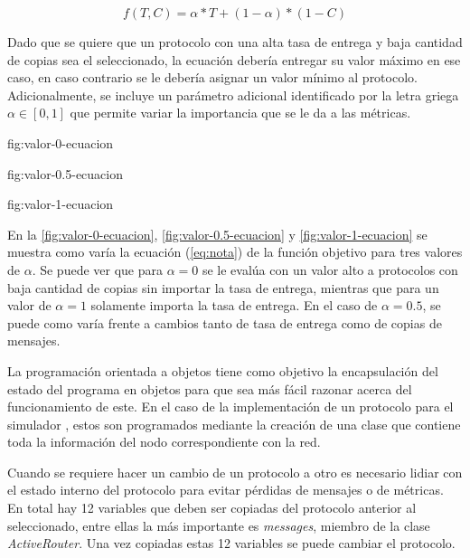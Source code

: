 


\begin{equation}
  f(T, C) = \alpha*T + (1 - \alpha)*(1 - C)
  \label{eq:nota}
\end{equation}

Dado que se quiere que un protocolo con una alta tasa de entrega y baja cantidad
de copias sea el seleccionado, la ecuación debería entregar su valor máximo en
ese caso, en caso contrario se le debería asignar un valor mínimo al protocolo.
Adicionalmente, se incluye un parámetro adicional identificado por la letra
griega $\alpha \in [0, 1]$ que permite variar la importancia que se le da a las
métricas. 



{}{fig:valor-0-ecuacion}

{}{fig:valor-0.5-ecuacion}

{}{fig:valor-1-ecuacion}

En la \ref{fig:valor-0-ecuacion}, \ref{fig:valor-0.5-ecuacion} y
\ref{fig:valor-1-ecuacion} se muestra como varía la ecuación (\ref{eq:nota}) de
la función objetivo para tres valores de $\alpha$. Se puede ver que para $\alpha
= 0$ se le evalúa con un valor alto a protocolos con baja cantidad de copias sin
importar la tasa de entrega, mientras que para un valor de $\alpha = 1$
solamente importa la tasa de entrega. En el caso de $\alpha = 0.5$, se puede
como varía frente a cambios tanto de tasa de entrega como de copias de mensajes.






La programación orientada a objetos tiene como objetivo la encapsulación del
estado del programa en objetos para que sea más fácil razonar acerca del
funcionamiento de este. En el caso de la implementación de un protocolo para el
simulador \theone, estos son programados mediante la creación de una clase que
contiene toda la información del nodo correspondiente con la red.


Cuando se requiere hacer un cambio de un protocolo a otro es necesario lidiar
con el estado interno del protocolo para evitar pérdidas de mensajes o de
métricas. En total hay 12 variables que deben ser copiadas del protocolo
anterior al seleccionado, entre ellas la más importante es \textit{messages},
miembro de la clase \textit{ActiveRouter}. Una vez copiadas estas 12 variables
se puede cambiar el protocolo.

